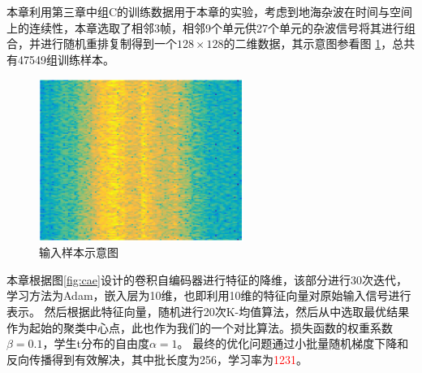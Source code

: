 本章利用第三章中组C的训练数据用于本章的实验，考虑到地海杂波在时间与空间上的连续性，本章选取了相邻3帧，相邻9个单元供27个单元的杂波信号将其进行组合，并进行随机重排复制得到一个$128\times 128$的二维数据，其示意图参看图 \ref{fig:unsurpvised_data}，总共有47549组训练样本。
\begin{figure}[hbt]
	\centering
	\includegraphics[width=6.67cm]{figures/AE/unsurpvised_data}
	\caption{输入样本示意图}
	\label{fig:unsurpvised_data}
\end{figure}
本章根据图\ref{fig:cae}设计的卷积自编码器进行特征的降维，该部分进行30次迭代，学习方法为Adam，嵌入层为10维，也即利用10维的特征向量对原始输入信号进行表示。
然后根据此特征向量，随机进行20次K-均值算法，然后从中选取最优结果作为起始的聚类中心点，此也作为我们的一个对比算法。损失函数的权重系数$\beta = 0.1$，学生t分布的自由度$\alpha = 1$。
最终的优化问题通过小批量随机梯度下降和反向传播得到有效解决，其中批长度为256，学习率为\textcolor{red}{1231}。

